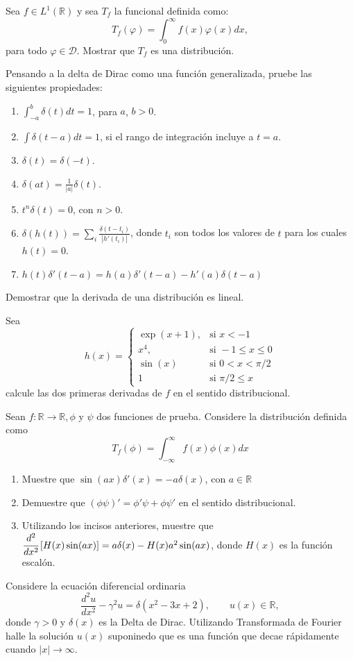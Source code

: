 \documentclass[11pt,spanish]{article}
\begin{document}
\prob Sea $f\in L^1(\mathbb{R})$ y sea $T_f$ la funcional definida como:
$$T_f(\varphi)=\int_0^{\infty}f(x)\varphi(x)dx,$$
para todo $\varphi\in \mathcal{D}$. Mostrar que $T_f$ es una distribución.

\prob Pensando a la delta de Dirac como una función generalizada, pruebe las siguientes propiedades:
\begin{enumerate}
 \item $\int_{-a}^{b} \delta(t)dt=1$, para $a$, $b>0$.
 \item $\int\delta(t-a)dt=1$, si el rango de integración incluye a $t=a$.
 \item $\delta(t)=\delta(-t)$.
 \item $\delta(at)=\frac{1}{|a|}\delta(t)$.
 \item $t^n\delta(t)=0$, con $n>0$.
 \item $\delta(h(t))=\sum_i\frac{\delta(t-t_i)}{|h'(t_i)|}$, donde $t_i$ son todos los valores de $t$ para los cuales $h(t)=0$.
 \item $h(t)\delta'(t-a)=h(a)\delta'(t-a)-h'(a)\delta(t-a)$

\end{enumerate}

\prob Demostrar que la derivada de una distribución es lineal.

\prob Sea
$$h(x)=\left\{\begin{array}{ll}
        \exp(x+1), & \text{si } x< -1\\
        x^4, & \text{si } -1\leq x\leq 0\\
        \sin(x) & \text{si } 0< x<\pi/2\\
        1& \text{si } \pi/2\leq x\end{array}\right.
$$
calcule las dos primeras derivadas de $f$ en el sentido distribucional.

\prob{} Sean $f: \mathbb{R} \rightarrow \mathbb{R}, \phi$ y $\psi$ dos funciones de prueba. Considere la distribuci\'on definida como
\[
T_f(\phi)=\int_{-\infty}^{\infty} f(x) \phi(x) dx
\]
\begin{enumerate}
\item Muestre que $\sin(ax) \delta'(x)= -a \delta(x)$, con $a \in \mathbb{R}$
\item Demuestre que $(\phi \psi)'= \phi' \psi + \phi \psi'$ en el sentido distribucional.
\item Utilizando los incisos anteriores, muestre que $\cfrac{d^2}{dx^2} \left[H(x) \sin(ax) \right]= a \delta(x) - H(x) a^2 \sin(ax)$, donde $H(x)$ es la funci\'on escal\'on.
\end{enumerate}

\prob Considere la ecuación diferencial ordinaria 
\[
\frac{d^2u}{dx^2} - \gamma^2 u = \delta(x^2-3x+2), \qquad u(x)\in \mathbb{R},
\]
donde $\gamma >0$ y $\delta(x)$ es la Delta de Dirac. Utilizando Transformada de Fourier halle la solución
$u(x)$ suponinedo que es una función que decae rápidamente cuando $|x|\to
\infty$. 


\end{document}
